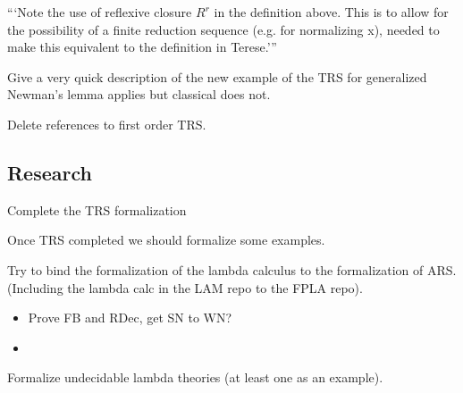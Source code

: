 \documentclass{article}
\newcommand{\cmark}{\ding{51}}%
\newcommand{\done}{\rlap{$\square$}{\raisebox{2pt}{\large\hspace{1pt}\cmark}}%
\hspace{-2.5pt}}
\begin{document}
\begin{todolist}
    ```Note the use of reflexive closure $R^r$ in the definition above. This is to allow for the possibility of a finite reduction sequence (e.g. for normalizing x), needed to make this equivalent to the definition in Terese.'''
    \item Give a very quick description of the new example of the TRS for generalized Newman's lemma applies but classical does not. 
    \item Delete references to first order TRS.
\end{todolist}
\subsection*{Research}
\begin{todolist}
    \item [\done] Complete the TRS formalization
    \item Once TRS completed we should formalize some examples.
    \item Try to bind the formalization of the lambda calculus to the formalization of ARS. (Including the lambda calc in the LAM repo to the FPLA repo).
    \begin{itemize}
        \item Prove FB and RDec, get SN to WN?
        \item
    \end{itemize}
    \item Formalize undecidable lambda theories (at least one as an example).
\end{todolist}
\end{document}
